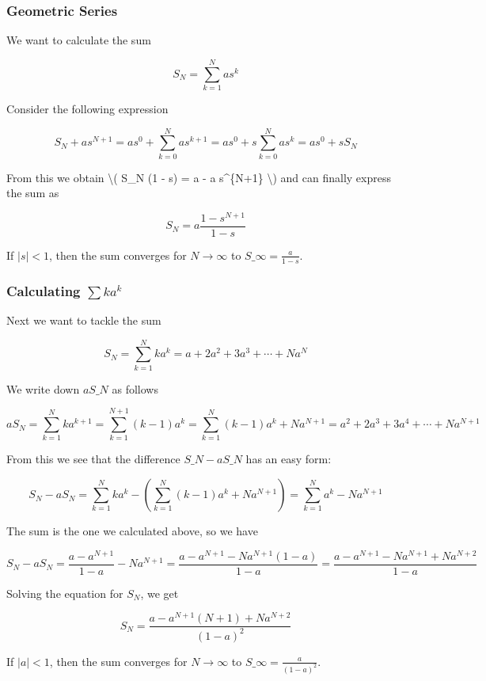 

\subsubsection{Geometric Series}

We want to calculate the sum

\[ S_N = \sum_{k=1}^N a s^k \]

Consider the following expression

\[ S_N + a s^{N+1} = a s^0 + \sum_{k=0}^N a s^{k+1} = a s^0 + s \sum_{k=0}^N a s^k = a s^0 + s S_N \]

From this we obtain \textbackslash{}( S\_N (1 - s) = a - a s\^{}\{N+1\}
\textbackslash{}) and can finally express the sum as

\[ S_N = a \frac{1 - s^{N+1} }{1 - s} \]

If $|s| < 1$, then the sum converges for $N \rightarrow \infty$ to $S\_\infty=\frac{a}{1-s}$.

\subsubsection{Calculating $\sum k a^k$}

Next we want to tackle the sum

\[ S_N = \sum_{k=1}^N k a^k = a + 2a^2 + 3a^3 + \cdots + Na^N\]

We write down $a S\_N$ as follows

\[ a S_N = \sum_{k=1}^N k a^{k+1} = \sum_{k=1}^{N+1} (k-1) a^{k} = \sum_{k=1}^{N} (k-1) a^{k} + N a^{N+1} = a^2 + 2 a^3 + 3 a^4 + \cdots + N a^{N+1}\]

From this we see that the difference $S\_N - a S\_N$ has an easy form:

\[ S_N - a S_N = \sum_{k=1}^N k a^k - \left( \sum_{k=1}^{N} (k-1) a^{k} + N a^{N+1} \right) = \sum_{k=1}^N a^k - N a^{N+1} \]

The sum is the one we calculated above, so we have

\[ S_N - a S_N = \frac{a - a^{N+1} }{1 - a} - N a^{N+1} = \frac{a - a^{N+1} - N a^{N+1}(1-a)}{1-a} = \frac{a - a^{N+1} - N a^{N+1} + N a^{N+2}}{1-a} \]

Solving the equation for $S_N$, we get

\[S_N = \frac{a - a^{N+1}(N+1) + N a^{N+2}}{(1-a)^2} \]

If $|a| < 1$, then the sum converges for $N \rightarrow \infty$ to $S\_\infty = \frac{a}{(1-a)^2}$.

